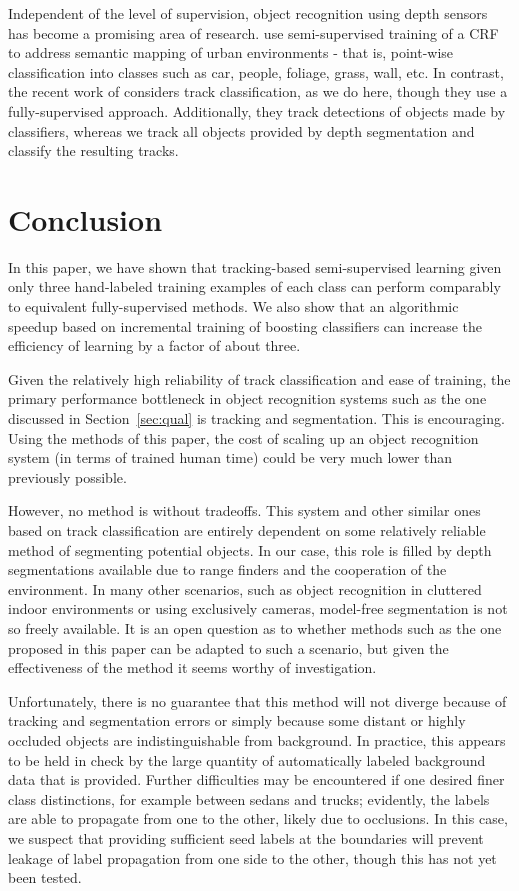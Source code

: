 \documentclass[conference]{IEEEtran}
\begin{document}
Independent of the level of supervision, object recognition using depth sensors has become a promising area of research.  \citet{Douillard2010} use semi-supervised training of a CRF to address semantic mapping of urban environments - that is, point-wise classification into classes such as car, people, foliage, grass, wall, etc.  In contrast, the recent work of \citet{Spinello2010} considers track classification, as we do here, though they use a fully-supervised approach.  Additionally, they track detections of objects made by classifiers, whereas we track all objects provided by depth segmentation and classify the resulting tracks.

\section{Conclusion} 
\label{sec:conclusion}

In this paper, we have shown that tracking-based semi-supervised learning given only three hand-labeled training examples of each class can perform comparably to equivalent fully-supervised methods.  We also show that an algorithmic speedup based on incremental training of boosting classifiers can increase the efficiency of learning by a factor of about three.

Given the relatively high reliability of track classification and ease of training, the primary performance bottleneck in object recognition systems such as the one discussed in Section~\ref{sec:qual} is tracking and segmentation.  This is encouraging.  Using the methods of this paper, the cost of scaling up an object recognition system (in terms of trained human time) could be very much lower than previously possible.

However, no method is without tradeoffs.  This system and other similar ones based on track classification are entirely dependent on some relatively reliable method of segmenting potential objects.  In our case, this role is filled by depth segmentations available due to range finders and the cooperation of the environment.  In many other scenarios, such as object recognition in cluttered indoor environments or using exclusively cameras, model-free segmentation is not so freely available.  It is an open question as to whether methods such as the one proposed in this paper can be adapted to such a scenario, but given the effectiveness of the method it seems worthy of investigation.

Unfortunately, there is no guarantee that this method will not diverge because of tracking and segmentation errors or simply because some distant or highly occluded objects are indistinguishable from background.  In practice, this appears to be held in check by the large quantity of automatically labeled background data that is provided.  Further difficulties may be encountered if one desired finer class distinctions, for example between sedans and trucks; evidently, the labels are able to propagate from one to the other, likely due to occlusions.  In this case, we suspect that providing sufficient seed labels at the boundaries will prevent leakage of label propagation from one side to the other, though this has not yet been tested.
\end{document}
